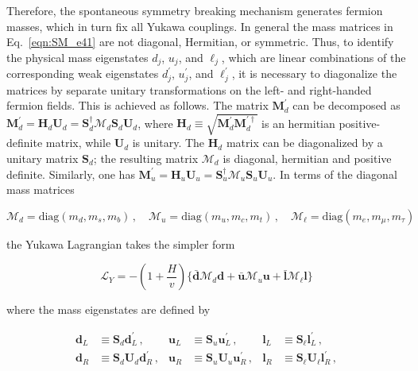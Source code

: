 Therefore, the spontaneous symmetry breaking mechanism generates fermion masses, which in turn fix all Yukawa couplings.
In general the mass matrices in Eq.~\ref{eqn:SM_e41} are not diagonal, Hermitian, or symmetric.
Thus, to identify the physical mass eigenstates $d_j$, $u_j$, and $\ell_j$, which are linear combinations of the corresponding weak eigenstates $d^\prime_j$, $u^\prime_j$, and $\ell^\prime_j$, it is necessary to diagonalize the matrices by separate unitary transformations on the left- and right-handed fermion fields. This is achieved as follows.
The matrix $\mathbf{M}^\prime_d$ can be decomposed as $\mathbf{M}^\prime_d = \mathbf{H}_d\mathbf{U}_d = \mathbf{S}^\dag_d\mathcal{M}_d\mathbf{S}_d\mathbf{U}_d$,
where $\mathbf{H}_d \equiv \sqrt{\mathbf{M}^\prime_d\mathbf{M}^{\prime\dag}_d}$ is an hermitian positive-definite matrix, while $\mathbf{U}_d$ is unitary.
The $\mathbf{H}_d$ matrix can be diagonalized by a unitary matrix $\mathbf{S}_d$; the resulting matrix $\mathcal{M}_d$ is diagonal, hermitian and positive definite.
Similarly, one has $\mathbf{M}^\prime_u = \mathbf{H}_u\mathbf{U}_u = \mathbf{S}^\dag_u\mathcal{M}_u\mathbf{S}_u\mathbf{U}_u$.
In terms of the diagonal mass matrices

\begin{equation}\label{eqn:SM_e42}
\mathcal{M}_d = \mathrm{diag}(m_d, m_s, m_b) \, , \quad \mathcal{M}_u = \mathrm{diag}(m_u, m_c, m_t) \, , \quad \mathcal{M}_\ell = \mathrm{diag}(m_e, m_\mu, m_\tau)
\end{equation}

\noindent the Yukawa Lagrangian takes the simpler form

\begin{equation}\label{eqn:SM_e43}
\mathcal{L}_Y = - (1 + \frac{H}{v}) \{ \bar{\mathbf{d}}\mathcal{M}_d\mathbf{d} + \bar{\mathbf{u}}\mathcal{M}_u\mathbf{u}  + \bar{\mathbf{l}}\mathcal{M}_\ell\mathbf{l} \}
\end{equation}

\noindent where the mass eigenstates are defined by

\begin{equation}\label{eqn:SM_e44}
\begin{aligned}
\mathbf{d}_L  & \equiv \mathbf{S}_d\mathbf{d}^\prime_L  \, ,                     & \mathbf{u}_L  & \equiv \mathbf{S}_u\mathbf{u}^\prime_L \, ,                       & \mathbf{l}_L & \equiv \mathbf{S}_\ell\mathbf{l}^\prime_L \, , \\
\mathbf{d}_R & \equiv \mathbf{S}_d\mathbf{U}_d\mathbf{d}^\prime_R \, , & \mathbf{u}_R & \equiv \mathbf{S}_u\mathbf{U}_u\mathbf{u}^\prime_R \, ,  & \mathbf{l}_R & \equiv \mathbf{S}_\ell\mathbf{U}_\ell\mathbf{l}^\prime_R \, , \\
\end{aligned}
\end{equation}

